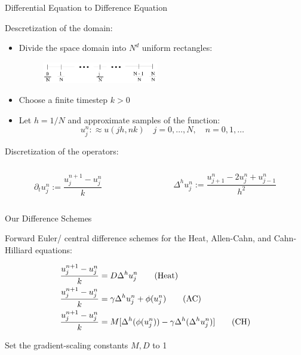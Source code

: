 \documentclass[professionalfont]{beamer}
\theoremstyle{remark}
\begin{document}
\begin{frame}{Differential Equation to Difference Equation}
	
	Descretization of the domain:
	\begin{itemize}
		\item Divide the space domain into $N^d$ uniform rectangles:
		\begin{figure}
			\centering
			\includegraphics[width=2in]{media/discrete_interval.png}	
		\end{figure}
		\item Choose a finite timestep $k>0$
		\item Let $h=1/N$ and approximate samples of the function: \begin{equation*}
		u_j^n:\approx u(jh,nk)\quad j=0,\ldots,N,\quad n=0,1,\ldots
	\end{equation*}
	\end{itemize}
	
	Discretization of the operators:
	\begin{columns}	
		\begin{column}{.45\paperwidth}
			\begin{equation*}
				\partial_t u_j^n:=\frac{u_j^{n+1}-u_j^n}{k}
			\end{equation*}	
		\end{column}

		\begin{column}{.45\paperwidth}
			\begin{equation}
				\Delta^hu_j^n:=\frac{u_{j+1}^n-2u_j^n+u_{j-1}^n}{h^2}
			\end{equation}
		\end{column}

	\end{columns}

\end{frame}

\begin{frame}{Our Difference Schemes}

	Forward Euler/ central difference schemes for the Heat, Allen-Cahn, and Cahn-Hilliard equations:

	\begin{align}
		\frac{u_j^{n+1}-u_j^n}{k}&=D\Delta^hu_j^n\tag{Heat}\label{eq_HE_DS}\\
		\frac{u_j^{n+1}-u_j^n}{k}&=\gamma\Delta^h u_j^n+\phi(u_j^n)\tag{AC}\label{eq_AC_DS}\\
		\frac{u_j^{n+1}-u_j^n}{k}&=M[\Delta^h(\phi(u_j^n))-\gamma\Delta^h(\Delta^h u_j^n)]\tag{CH}{\label{eq_CH_DS}}
	\end{align}

	Set the gradient-scaling constants $M,D$ to 1

\end{frame}
\end{document}
